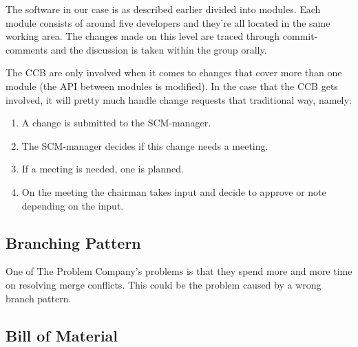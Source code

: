 \documentclass[a4paper,11pt]{article}
\begin{document}
The software in our case is as described earlier divided into modules. Each module consists of around five developers and they're all
located in the same working area. The changes made on this level are traced through commit-comments and the discussion is taken within
the group orally.

The CCB are only involved when it comes to changes that cover more than one module (the API between modules is modified).
In the case that the CCB gets involved, it will pretty much handle change requests that traditional way, namely:

\begin{enumerate}
 \item A change is submitted to the SCM-manager.
 \item The SCM-manager decides if this change needs a meeting.
 \item If a meeting is needed, one is planned.
 \item On the meeting the chairman takes input and decide to approve or note depending on the input.
\end{enumerate}



\subsection{Branching Pattern}

One of The Problem Company's problems is that they spend more and more time on resolving merge conflicts.
This could be the problem caused by a wrong branch pattern.

\subsection{Bill of Material}
\end{document}
